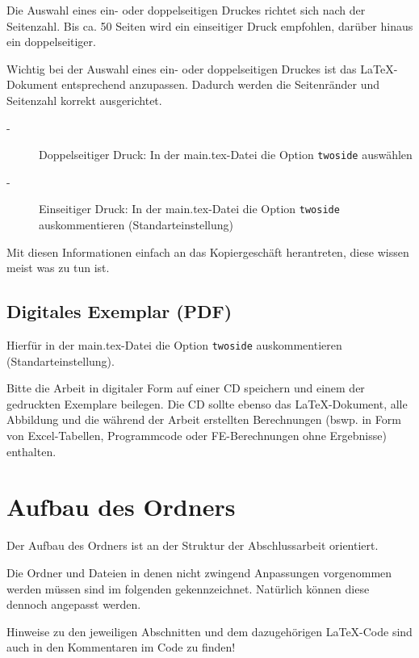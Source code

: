 Die Auswahl eines ein- oder doppelseitigen Druckes richtet sich nach der Seitenzahl. Bis ca. 50 Seiten wird ein einseitiger Druck empfohlen, darüber hinaus ein doppelseitiger.

Wichtig bei der Auswahl eines ein- oder doppelseitigen Druckes ist das LaTeX-Dokument entsprechend anzupassen. Dadurch werden die Seitenränder und Seitenzahl korrekt ausgerichtet.

\begin{description}
	\item[-] Doppelseitiger Druck: In der main.tex-Datei die Option \lstinline[basicstyle=\ttfamily]|twoside| auswählen
	\item[-] Einseitiger Druck: In der main.tex-Datei die Option \lstinline[basicstyle=\ttfamily]|twoside| auskommentieren (Standarteinstellung)
\end{description}

Mit diesen Informationen einfach an das Kopiergeschäft herantreten, diese wissen meist was zu tun ist.

\subsection*{Digitales Exemplar (PDF)}

Hierfür in der main.tex-Datei die Option \lstinline[basicstyle=\ttfamily]|twoside| auskommentieren (Standarteinstellung).

Bitte die Arbeit in digitaler Form auf einer CD speichern und einem der gedruckten Exemplare beilegen. Die CD sollte ebenso das LaTeX-Dokument, alle Abbildung und die während der Arbeit erstellten Berechnungen (bswp. in Form von Excel-Tabellen, Programmcode oder FE-Berechnungen ohne Ergebnisse) enthalten.

\newpage

\section*{Aufbau des Ordners}

Der Aufbau des Ordners ist an der Struktur der Abschlussarbeit orientiert. 

Die Ordner und Dateien in denen nicht zwingend Anpassungen vorgenommen werden müssen sind im folgenden gekennzeichnet. Natürlich können diese dennoch angepasst werden.

Hinweise zu den jeweiligen Abschnitten und dem dazugehörigen LaTeX-Code sind auch in den Kommentaren im Code zu finden!\\ 
\\

